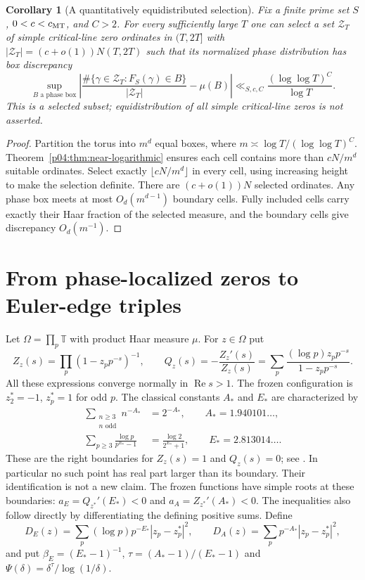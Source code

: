 \documentclass[11pt,letterpaper]{article}
\newtheorem{corollary}[theorem]{Corollary}
\theoremstyle{definition}
\theoremstyle{remark}
\newcommand{\T}{\mathbb T}
\renewcommand{\Re}{\operatorname{Re}}
\newcommand{\1}{\mathbf 1}
\begin{document}
\begin{corollary}[A quantitatively equidistributed selection]
\label{p04:cor:equidistributed-selection}
Fix a finite prime set $S$, $0<c<c_{\rm MT}$, and $C>2$.
For every sufficiently large $T$ one can select a set
$\mathcal Z_T$ of simple critical-line zero ordinates in $(T,2T]$
with $|\mathcal Z_T|=(c+o(1))N(T,2T)$ such that its normalized
phase distribution has box discrepancy
\[
 \sup_{B\text{ a phase box}}
 \left|\frac{\#\{\gamma\in\mathcal Z_T:F_S(\gamma)\in B\}}
                   {|\mathcal Z_T|}-\mu(B)\right|
 \ll_{S,c,C}\frac{(\log\log T)^C}{\log T}.
\]
This is a selected subset; equidistribution of all simple
critical-line zeros is not asserted.
\end{corollary}
\begin{proof}
Partition the torus into $m^d$ equal boxes, where
$m\asymp\log T/(\log\log T)^C$. Theorem~\ref{p04:thm:near-logarithmic}
ensures each cell contains more than $cN/m^d$ suitable ordinates.
Select exactly $\lfloor cN/m^d\rfloor$ in every cell, using
increasing height to make the selection definite. There are
$(c+o(1))N$ selected ordinates. Any phase box meets at most
$O_d(m^{d-1})$ boundary cells. Fully included cells carry exactly
their Haar fraction of the selected measure, and the boundary
cells give discrepancy $O_d(m^{-1})$.
\end{proof}




\section{From phase-localized zeros to Euler-edge triples}
\label{p03:sec:edge-triples}Let $\Omega=\prod_p\T$ with product Haar measure $\mu$. For
$z\in\Omega$ put
\[
 Z_z(s)=\prod_p(1-z_pp^{-s})^{-1},\qquad
 Q_z(s)=-\frac{Z_z'(s)}{Z_z(s)}
       =\sum_p\frac{(\log p)z_pp^{-s}}{1-z_pp^{-s}}.
\]
All these expressions converge normally in $\Re s>1$.
The frozen configuration is $z_2^*=-1$, $z_p^*=1$ for odd $p$.
The classical constants $A_*$ and $E_*$ are characterized by
\begin{align*}
 \sum_{\substack{n\ge3\\n\text{ odd}}}n^{-A_*}&=2^{-A_*},\qquad
 A_*=1.940101\ldots,\\
 \sum_{p\ge3}\frac{\log p}{p^{E_*}-1}
 &=\frac{\log2}{2^{E_*}+1},\qquad E_*=2.813014\ldots.
\end{align*}
These are the right boundaries for $Z_z(s)=1$ and $Q_z(s)=0$;
see \cite{AriasLune}. In particular no such point has real part
larger than its boundary. Their identification is not a new claim.
The frozen functions have simple roots at these boundaries:
$a_E=Q_{z^*}'(E_*)<0$ and $a_A=Z_{z^*}'(A_*)<0$.
The inequalities also follow directly by differentiating the defining
positive sums. Define
\[
 D_E(z)=\sum_p(\log p)p^{-E_*}|z_p-z_p^*|^2,\qquad
 D_A(z)=\sum_pp^{-A_*}|z_p-z_p^*|^2,
\]
and put $\beta_E=(E_*-1)^{-1}$,
$\tau=(A_*-1)/(E_*-1)$ and
$\Psi(\delta)=\delta^\tau/\log(1/\delta)$.
\end{document}

